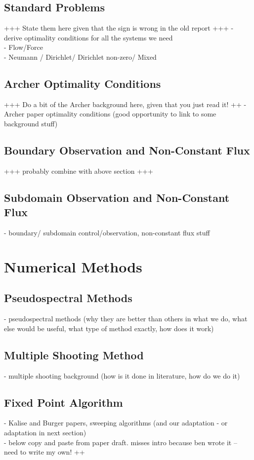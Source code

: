 \documentclass[11pt, a4paper]{article}
\theoremstyle{definition}
\begin{document}
\subsection{Standard Problems}
+++ State them here given that the sign is wrong in the old report +++
- derive optimality conditions for all the systems we need \\
- Flow/Force\\
- Neumann / Dirichlet/ Dirichlet non-zero/ Mixed\\
\subsection{Archer Optimality Conditions}
+++ Do a bit of the Archer background here, given that you just read it! ++
- Archer paper optimality conditions (good opportunity to link to some background stuff)

\subsection{Boundary Observation and Non-Constant Flux}
+++ probably combine with above section +++

\subsection{Subdomain Observation and Non-Constant Flux}
- boundary/ subdomain control/observation, non-constant flux stuff\\


\section{Numerical Methods}
\subsection{Pseudospectral Methods}
- pseudospectral methods (why they are better than others in what we do, what else would be useful, what type of method exactly, how does it work)
\subsection{Multiple Shooting Method}
- multiple shooting background (how is it done in literature, how do we do it)
\subsection{Fixed Point Algorithm}
- Kalise and Burger papers, sweeping algorithms (and our adaptation - or adaptation in next section)\\
- below copy and paste from paper draft. misses intro because ben wrote it -- need to write my own! ++
\end{document}
